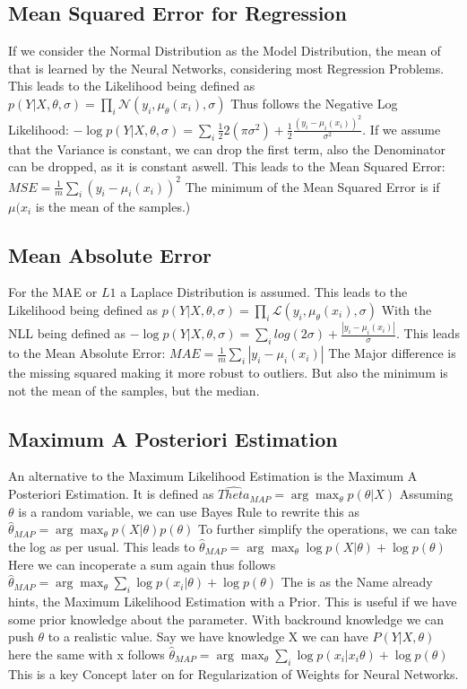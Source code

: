 \documentclass[a4paper]{article}
\begin{document}
\subsection{Mean Squared Error for Regression}
If we consider the Normal Distribution as the Model Distribution, the mean of that is learned by the Neural Networks, considering most Regression Problems. This leads to the Likelihood being defined as $p(Y|X,\theta, \sigma) = \prod_{i} \mathcal{N}(y_{i},\mu_{\theta}(x_{i}),\sigma)$
Thus follows the Negative Log Likelihood: $- \log p(Y|X,\theta, \sigma) =  \sum_{i} \frac{1}{2} 2(\pi \sigma^{2}) + \frac{1}{2} \frac{(y_{i} - \mu_{i}(x_{i}))^{2}}{\sigma^{2}}$. If we assume that the Variance is constant, we can drop the first term, also the Denominator can be dropped, as it is constant aswell. This leads to the Mean Squared Error: $MSE = \frac{1}{m} \sum_{i} (y_{i} - \mu_{i}(x_{i}))^{2}$
The minimum of the Mean Squared Error is if $\mu(x_{i}$ is the mean of the samples.)


\subsection{Mean Absolute Error}
For the MAE or $L{1}$ a Laplace Distribution is assumed. This leads to the Likelihood being defined as $p(Y|X,\theta, \sigma) = \prod_{i} \mathcal{L}(y_{i},\mu_{\theta}(x_{i}),\sigma)$ With the NLL being defined as $- \log p(Y|X,\theta, \sigma) =  \sum_{i} log(2 \sigma) + \frac{|y_{i} - \mu_{i}(x_{i})|}{\sigma}$. This leads to the Mean Absolute Error: $MAE = \frac{1}{m} \sum_{i} |y_{i} - \mu_{i}(x_{i})|$ The Major difference is the missing squared making it more robust to outliers. But also the minimum is not the mean of the samples, but the median. 

\subsection{Maximum A Posteriori Estimation}
An alternative to the Maximum Likelihood Estimation is the Maximum A Posteriori Estimation. It is defined as $\hat{Theta}_{MAP} = \arg \max _{\theta} p(\theta|X)$
Assuming $\theta$ is a random variable, we can use Bayes Rule to rewrite this as $\hat{\theta}_{MAP} = \arg \max _{\theta} p(X|\theta) p(\theta)$ To further simplify the operations, we can take the log as per usual. This leads to $\hat{\theta}_{MAP} = \arg \max _{\theta} \log p(X|\theta) + \log p(\theta)$ Here we can incoperate a sum again thus follows $\hat{\theta}_{MAP} = \arg \max _{\theta} \sum_{i} \log p(x_{i}|\theta) + \log p(\theta)$
The is as the Name already hints, the Maximum Likelihood Estimation with a Prior. This is useful if we have some prior knowledge about the parameter. With backround knowledge we can push $\theta$ to a realistic value. Say we have knowledge X we can have  $P(Y|X,\theta)$ here the same with x follows $\hat{\theta}_{MAP} = \arg \max _{\theta} \sum_{i} \log p(x_{i}|x_{i}\theta) + \log p(\theta)$
This is a key Concept later on for Regularization of Weights for Neural Networks.
\end{document}
